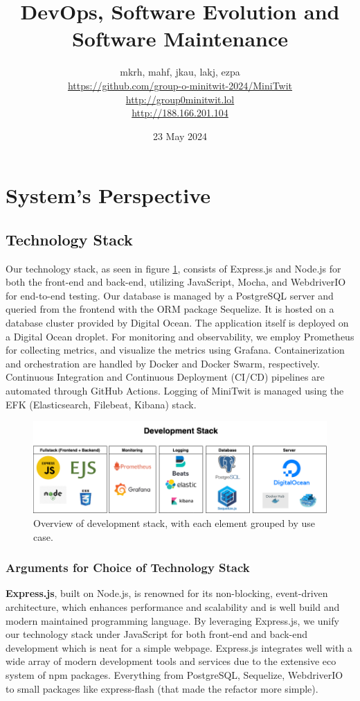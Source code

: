 \documentclass[11pt]{article}
\title{DevOps, Software Evolution and Software Maintenance}
\author{mkrh, mahf, jkau, lakj, ezpa \\
\url{https://github.com/group-o-minitwit-2024/MiniTwit}\\
\url{http://group0minitwit.lol}\\
\url{http://188.166.201.104}
}
\date{23 May 2024}
\begin{document}
\maketitle

\section{System's Perspective}
\subsection{Technology Stack}
Our technology stack, as seen in figure \ref{fig:dev-stack}, consists of Express.js and Node.js for both the front-end and back-end, utilizing JavaScript, Mocha, and WebdriverIO for end-to-end testing. Our database is managed by a PostgreSQL server and queried from the frontend with the ORM package Sequelize. It is hosted on a database cluster provided by Digital Ocean. The application itself is deployed on a Digital Ocean droplet. For monitoring and observability, we employ Prometheus for collecting metrics, and visualize the metrics using Grafana. Containerization and orchestration are handled by Docker and Docker Swarm, respectively. Continuous Integration and Continuous Deployment (CI/CD) pipelines are automated through GitHub Actions. Logging of MiniTwit is managed using the EFK (Elasticsearch, Filebeat, Kibana) stack.

\begin{figure}[!h]
    \centering
    \includegraphics[width=\textwidth]{images/techstack.png}
    \caption{Overview of development stack, with each element grouped by use case.}
    \label{fig:dev-stack}
\end{figure}

\subsubsection{Arguments for Choice of Technology Stack}
\textbf{Express.js}, built on Node.js, is renowned for its non-blocking, event-driven architecture, which enhances performance and scalability and is well build and modern maintained programming language. By leveraging Express.js, we unify our technology stack under JavaScript for both front-end and back-end development which is neat for a simple webpage. Express.js integrates well with a wide array of modern development tools and services due to the extensive eco system of npm packages. Everything from PostgreSQL, Sequelize, WebdriverIO to small packages like express-flash (that made the refactor more simple).
\end{document}
